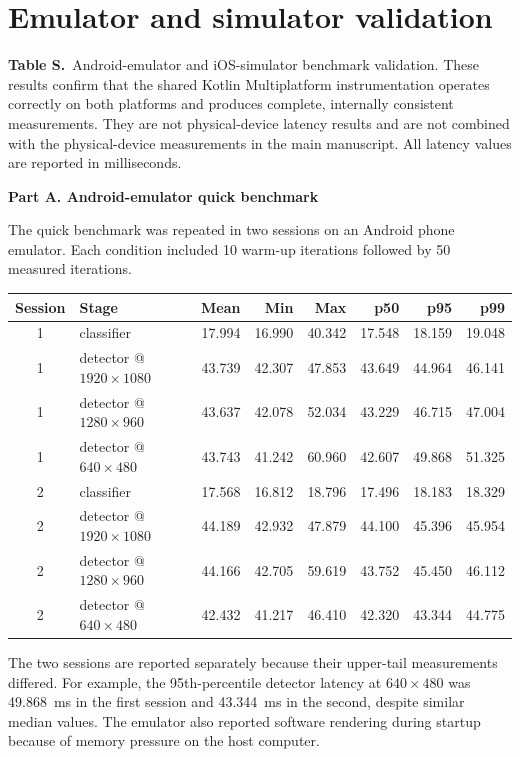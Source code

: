 \documentclass[preprint,12pt,authoryear]{elsarticle}
\newcommand{\tablehead}[2]{%
  \par\addvspace{\bigskipamount}%
  \needspace{12\baselineskip}%
  \refstepcounter{table}\label{#1}%
  {\footnotesize\noindent\textbf{Table \thetable.}~#2\par}%
  \nopagebreak\addvspace{4pt}\nopagebreak}
\renewcommand{\thetable}{S\arabic{table}}
\begin{document}
\section{Emulator and simulator validation}
\label{sup:harness}

\tablehead{tab:S1}{Android-emulator and iOS-simulator benchmark validation.
These results confirm that the shared Kotlin Multiplatform instrumentation
operates correctly on both platforms and produces complete, internally
consistent measurements. They are not physical-device latency results and are
not combined with the physical-device measurements in the main manuscript.
All latency values are reported in milliseconds.}

\noindent\textbf{Part A. Android-emulator quick benchmark}

The quick benchmark was repeated in two sessions on an Android phone emulator.
Each condition included 10 warm-up iterations followed by 50 measured
iterations.

\begin{center}
\scriptsize
\setlength{\tabcolsep}{4pt}
\begin{tabular}{c l r r r r r r}
\toprule
Session & Stage & Mean & Min & Max & p50 & p95 & p99 \\
\midrule
1 & classifier                    & 17.994 & 16.990 & 40.342 & 17.548 & 18.159 & 19.048 \\
1 & detector @$1920\times1080$    & 43.739 & 42.307 & 47.853 & 43.649 & 44.964 & 46.141 \\
1 & detector @$1280\times960$     & 43.637 & 42.078 & 52.034 & 43.229 & 46.715 & 47.004 \\
1 & detector @$640\times480$      & 43.743 & 41.242 & 60.960 & 42.607 & 49.868 & 51.325 \\
2 & classifier                    & 17.568 & 16.812 & 18.796 & 17.496 & 18.183 & 18.329 \\
2 & detector @$1920\times1080$    & 44.189 & 42.932 & 47.879 & 44.100 & 45.396 & 45.954 \\
2 & detector @$1280\times960$     & 44.166 & 42.705 & 59.619 & 43.752 & 45.450 & 46.112 \\
2 & detector @$640\times480$      & 42.432 & 41.217 & 46.410 & 42.320 & 43.344 & 44.775 \\
\bottomrule
\end{tabular}
\end{center}

{\footnotesize
The two sessions are reported separately because their upper-tail measurements
differed. For example, the 95th-percentile detector latency at
$640\times480$ was 49.868~ms in the first session and 43.344~ms in the
second, despite similar median values. The emulator also reported software
rendering during startup because of memory pressure on the host computer.
\par}
\end{document}
